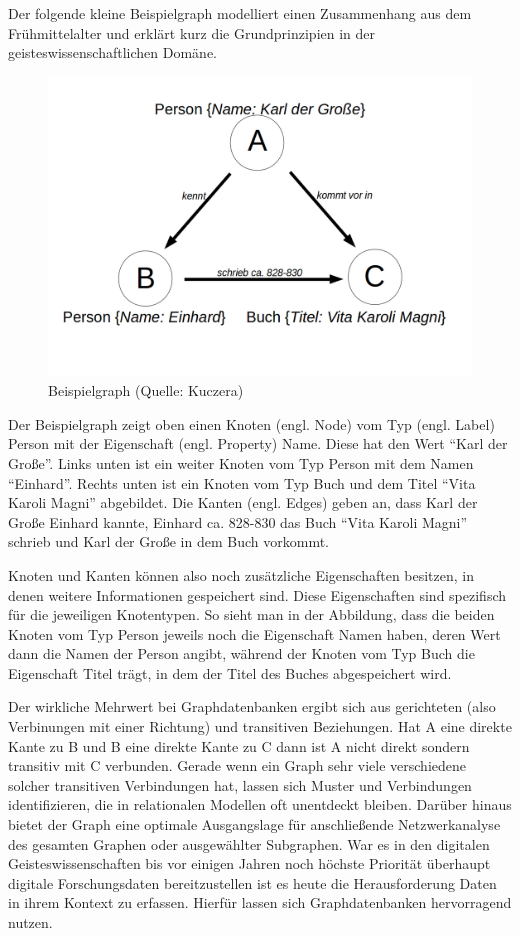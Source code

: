 \documentclass[ngerman,]{scrreprt}
\begin{document}
Der folgende kleine Beispielgraph modelliert einen Zusammenhang aus dem Frühmittelalter und erklärt kurz die Grundprinzipien in der geisteswissenschaftlichen Domäne.

\begin{figure}
\centering
\includegraphics{Bilder/Beispielgraph.png}
\caption{Beispielgraph (Quelle: Kuczera)}
\end{figure}

Der Beispielgraph zeigt oben einen Knoten (engl. Node) vom Typ (engl. Label) Person mit der Eigenschaft (engl. Property) Name. Diese hat den Wert ``Karl der Große''. Links unten ist ein weiter Knoten vom Typ Person mit dem Namen ``Einhard''. Rechts unten ist ein Knoten vom Typ Buch und dem Titel ``Vita Karoli Magni'' abgebildet. Die Kanten (engl. Edges) geben an, dass Karl der Große Einhard kannte, Einhard ca. 828-830 das Buch ``Vita Karoli Magni'' schrieb und Karl der Große in dem Buch vorkommt.

Knoten und Kanten können also noch zusätzliche Eigenschaften besitzen, in denen weitere Informationen gespeichert sind. Diese Eigenschaften sind spezifisch für die jeweiligen Knotentypen. So sieht man in der Abbildung, dass die beiden Knoten vom Typ Person jeweils noch die Eigenschaft Namen haben, deren Wert dann die Namen der Person angibt, während der Knoten vom Typ Buch die Eigenschaft Titel trägt, in dem der Titel des Buches abgespeichert wird.

Der wirkliche Mehrwert bei Graphdatenbanken ergibt sich aus gerichteten (also Verbinungen mit einer Richtung) und transitiven Beziehungen. Hat A eine direkte Kante zu B und B eine direkte Kante zu C dann ist A nicht direkt sondern transitiv mit C verbunden. Gerade wenn ein Graph sehr viele verschiedene solcher transitiven Verbindungen hat, lassen sich Muster und Verbindungen identifizieren, die in relationalen Modellen oft unentdeckt bleiben. Darüber hinaus bietet der Graph eine optimale Ausgangslage für anschließende Netzwerkanalyse des gesamten Graphen oder ausgewählter Subgraphen. War es in den digitalen Geisteswissenschaften bis vor einigen Jahren noch höchste Priorität überhaupt digitale Forschungsdaten bereitzustellen ist es heute die Herausforderung Daten in ihrem Kontext zu erfassen. Hierfür lassen sich Graphdatenbanken hervorragend nutzen.
\end{document}

